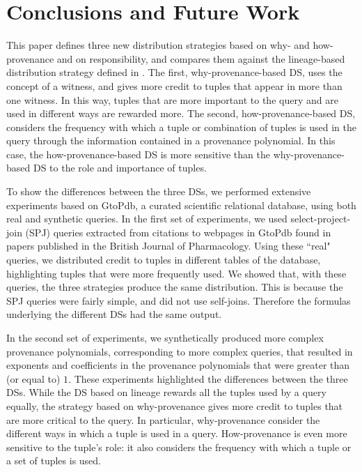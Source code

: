 \section{Conclusions and Future Work}
\label{section:conclusions}

This paper 
defines three new distribution strategies based on why- and how-provenance and on responsibility, and compares them against the lineage-based distribution strategy defined in \cite{dosso2020data}. 
The first, why-provenance-based DS, uses the concept of a witness, and gives more credit to tuples that appear in more than one witness. 
In this way, tuples that are more important to the query and are used in different ways are rewarded more. %
The second, how-provenance-based DS, considers the frequency with which a tuple or combination of tuples is used in the query through the information contained in a provenance polynomial. In this case, the how-provenance-based DS is more sensitive than the why-provenance-based DS to the role and importance of tuples.

To show the differences between the three DSs, we performed extensive experiments based on GtoPdb, a curated scientific relational database, using both real and synthetic queries. 
In the first set of experiments, we used select-project-join (SPJ) queries extracted from citations to webpages in GtoPdb found in papers published in the British Journal of Pharmacology. 
Using these ``real" queries, we distributed credit to tuples in different tables of the database, highlighting tuples that were more frequently used. 
We showed that, with these queries, the three strategies produce the same distribution. This is because the SPJ queries were fairly simple, and did not use self-joins. Therefore the formulas underlying the different DSs had the same output.

In the second set of experiments, we synthetically produced more complex provenance polynomials, corresponding to more complex queries, that resulted in exponents and coefficients in the provenance polynomials that were greater than (or equal to) $1$.
These experiments highlighted the differences between the three DSs.
While the DS based on lineage rewards all the tuples used by a query equally, the strategy based on why-provenance gives more credit to  tuples that are more critical to the query. 
In particular, why-provenance consider the different ways in which a tuple is used in a query.  
How-provenance is even more sensitive to the tuple's role: it also considers the frequency with which a tuple or a set of tuples is used. %

